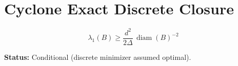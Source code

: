 \documentclass{article}
\begin{document}
\section*{Cyclone Exact Discrete Closure}

\[
\lambda_1(B)\ge
\frac{d^2}{2\Delta}\,\operatorname{diam}(B)^{-2}
\]

\textbf{Status:} Conditional (discrete minimizer assumed optimal).
\end{document}

